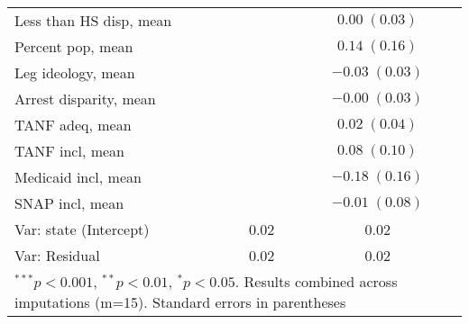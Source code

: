 \begin{table}
\begin{center}
\begin{tabular}{l c c }
Less than HS disp, mean    &                         & $0.00 \; (0.03)$        \\
Percent pop, mean          &                         & $0.14 \; (0.16)$        \\
Leg ideology, mean         &                         & $-0.03 \; (0.03)$       \\
Arrest disparity, mean     &                         & $-0.00 \; (0.03)$       \\
TANF adeq, mean            &                         & $0.02 \; (0.04)$        \\
TANF incl, mean            &                         & $0.08 \; (0.10)$        \\
Medicaid incl, mean        &                         & $-0.18 \; (0.16)$       \\
SNAP incl, mean            &                         & $-0.01 \; (0.08)$       \\
\hline
Var: state (Intercept)     & 0.02                    & 0.02                    \\
Var: Residual              & 0.02                    & 0.02                    \\
\hline
\multicolumn{3}{l}{\scriptsize{$^{***}p<0.001$, $^{**}p<0.01$, $^*p<0.05$. Results combined across imputations (m=15). Standard errors in parentheses}}
\end{tabular}
\label{table:coefficients}
\end{center}
\end{table}
